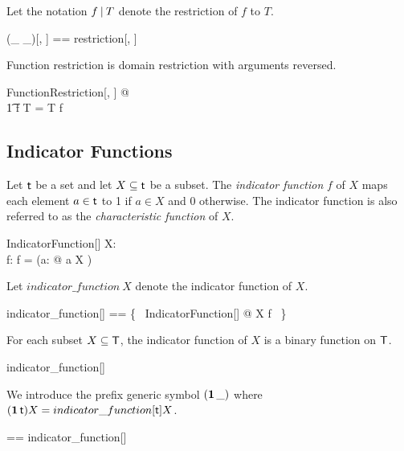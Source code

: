 \documentclass{amsart}
\begin{document}
Let the notation $f \mathbin{|} T$ denote the restriction of $f$ to $T$.

\begin{zed}
	(\_ \restrictU \_)[\genT, \genU] == restriction[\genT, \genU]
\end{zed}

\begin{remark}
Function restriction is domain restriction with arguments reversed.
\begin{zed}
	\forall FunctionRestriction[\setT, \setU] @ \\
	\t1	f \restrictU T = T \dres f
\end{zed}
\end{remark}

\subsection{Indicator Functions}

Let $\mathsf{t}$ be a set and let $X \subseteq \mathsf{t}$ be a subset.
The \textit{indicator function}  $f$  of $X$ maps each element $a \in \mathsf{t}$ to 1 if $a \in X$ and 0 otherwise.
The indicator function is also referred to as the \textit{characteristic function} of $X$.

\begin{schema}{IndicatorFunction}[\genT]
	X: \power \genT \\
	f: \genT \fun \B
\where
	f = (\lambda a: \genT @ \IF a \in X  )
\end{schema}

Let $indicator\_function~X$ denote the indicator function of $X$.

\begin{zed}
	indicator\_function[\genT] == \{~ IndicatorFunction[\genT] @ X \mapsto f ~\}
\end{zed}

\begin{remark}
For each subset $X \subseteq \mathsf{T}$, the indicator function of $X$ is a binary function on $\mathsf{T}$.
\begin{zed}
	indicator\_function[\setT] \in \power \setT \fun \setT \fun \B
\end{zed}
\end{remark}

We introduce the prefix generic symbol $(\operatorname{\mathbf{1}} \_)$ where $(\operatorname{\mathbf{1}} \mathsf{t})X = indicator\_function[\mathsf{t}] X$.

\begin{zed}
	\indF \genT == indicator\_function[\genT]
\end{zed}
\end{document}
